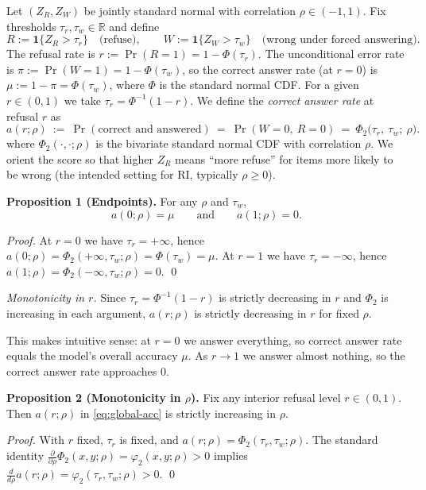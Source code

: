 \documentclass{article} %
\theoremstyle{definition}
\begin{document}
Let \((Z_R,Z_W)\) be jointly standard normal with correlation \(\rho\in(-1,1)\).
Fix thresholds \(\tau_r,\tau_w\in\mathbb R\) and define
\[
R := \mathbf{1}\{Z_R>\tau_r\}\quad\text{(refuse)},\qquad
W := \mathbf{1}\{Z_W>\tau_w\}\quad\text{(wrong under forced answering)}.
\]
The refusal rate is \(r:=\Pr(R=1)=1-\Phi(\tau_r)\).
The unconditional error rate is \(\pi:=\Pr(W=1)=1-\Phi(\tau_w)\), so the correct answer rate (at \(r=0\)) is \(\mu:=1-\pi=\Phi(\tau_w)\), where \(\Phi\) is the standard normal CDF.
For a given \(r\in(0,1)\) we take \(\tau_r=\Phi^{-1}(1-r)\).
We define the \emph{correct answer rate} at refusal \(r\) as
\begin{equation}
\label{eq:global-acc}
a(r;\rho)\ :=\ \Pr(\text{correct and answered})
\ =\ \Pr(W=0,\ R=0)
\ =\ \Phi_2\!\bigl(\tau_r,\ \tau_w;\ \rho\bigr).
\end{equation}
where \(\Phi_2(\cdot,\cdot;\rho)\) is the bivariate standard normal CDF with correlation \(\rho\).
We orient the score so that higher \(Z_R\) means ``more refuse'' for items more likely to be wrong (the intended setting for RI, typically \(\rho\ge 0\)).

\textbf{Proposition 1 (Endpoints).}
For any \(\rho\) and \(\tau_w\),
\[
a(0;\rho)=\mu\qquad\text{and}\qquad a(1;\rho)=0.
\]

\emph{Proof.}
At \(r=0\) we have \(\tau_r=+\infty\), hence
\(
a(0;\rho)=\Phi_2(+\infty,\tau_w;\rho)=\Phi(\tau_w)=\mu.
\)
At \(r=1\) we have \(\tau_r=-\infty\), hence
\(
a(1;\rho)=\Phi_2(-\infty,\tau_w;\rho)=0.
\)
\qed

\emph{Monotonicity in \(r\).}
Since \(\tau_r=\Phi^{-1}(1-r)\) is strictly decreasing in \(r\) and \(\Phi_2\) is increasing in each argument, \(a(r;\rho)\) is strictly decreasing in \(r\) for fixed \(\rho\).

This makes intuitive sense:
at \(r=0\) we answer everything, so correct answer rate equals the model's overall accuracy \(\mu\).
As \(r\to 1\) we answer almost nothing, so the correct answer rate approaches \(0\).

\textbf{Proposition 2 (Monotonicity in \(\rho\)).}
Fix any interior refusal level \(r\in(0,1)\).
Then \(a(r;\rho)\) in \eqref{eq:global-acc} is strictly increasing in \(\rho\).

\emph{Proof.}
With \(r\) fixed, \(\tau_r\) is fixed, and
\(
a(r;\rho)=\Phi_2(\tau_r,\tau_w;\rho).
\)
The standard identity
\(
\frac{\partial}{\partial \rho}\Phi_2(x,y;\rho)=\varphi_2(x,y;\rho)>0
\)
 implies
\(
\frac{d}{d\rho}a(r;\rho)=\varphi_2(\tau_r,\tau_w;\rho)>0.
\)
\qed
\end{document}
